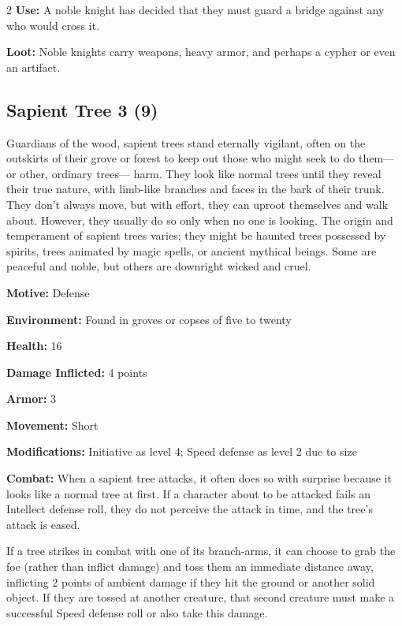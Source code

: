 \begin{multicols}{2}
\textbf{Use:} A noble knight has decided that they must guard a bridge against any who would cross it. 

\textbf{Loot:} Noble knights carry weapons, heavy armor, and perhaps a cypher or even an artifact.

\subsection{Sapient Tree 3 (9)}

Guardians of the wood, sapient trees stand eternally vigilant, often on the outskirts of their grove or forest to keep out those who might seek to do them—or other, ordinary trees— harm. They look like normal trees until they reveal their true nature, with limb-like branches and faces in the bark of their trunk. They don’t always move, but with effort, they can uproot themselves and walk about. However, they usually do so only when no one is looking. The origin and temperament of sapient trees varies; they might be haunted trees possessed by spirits, trees animated by magic spells, or ancient mythical beings. Some are peaceful and noble, but others are downright wicked and cruel. 

\textbf{Motive:} Defense 

\textbf{Environment:} Found in groves or copses of five to twenty 

\textbf{Health:} 16 

\textbf{Damage Inflicted:} 4 points 

\textbf{Armor:} 3 

\textbf{Movement:} Short 

\textbf{Modifications:} Initiative as level 4; Speed defense as level 2 due to size 

\textbf{Combat:} When a sapient tree attacks, it often does so with surprise because it looks like a normal tree at first. If a character about to be attacked fails an Intellect defense roll, they do not perceive the attack in time, and the tree’s attack is eased. 

If a tree strikes in combat with one of its branch-arms, it can choose to grab the foe (rather than inflict damage) and toss them an immediate distance away, inflicting 2 points of ambient damage if they hit the ground or another solid object. If they are tossed at another creature, that second creature must make a successful Speed defense roll or also take this damage. 


\end{multicols}
